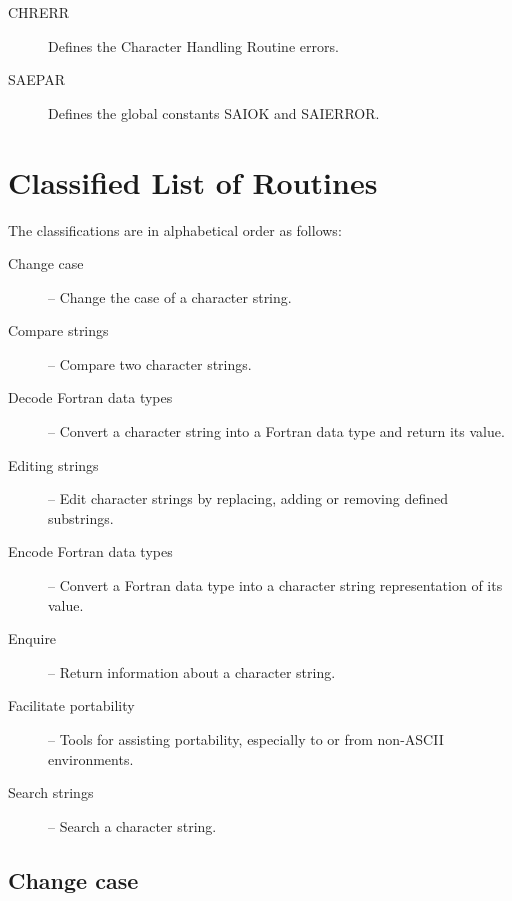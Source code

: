 \documentclass[twoside,11pt]{article}
\renewcommand{\_}{\texttt{\symbol{95}}}
\begin{document}
\begin {description}
\item [CHR\_ERR] Defines the Character Handling Routine errors.
\item [SAE\_PAR] Defines the global constants SAI\_\_OK and SAI\_\_ERROR.
\end {description}

\newpage
\section {Classified List of Routines \label{class_sect}}

The classifications are in alphabetical order as follows:

\begin{description}
\item[Change case] --
    Change the case of a character string.
\item[Compare strings] --
    Compare two character strings.
\item[Decode Fortran data types] --
    Convert a character string into a Fortran data type and return its
    value.
\item[Editing strings] -- 
    Edit character strings by replacing, adding or removing defined 
    substrings.
\item[Encode Fortran data types] --
    Convert a Fortran data type into a character string representation of
    its value.
\item[Enquire] --
    Return information about a character string.
\item[Facilitate portability] --
    Tools for assisting portability, especially to or from non-ASCII
    environments.
\item[Search strings] --
    Search a character string.
\end{description}


\subsection {Change case}
\end{document}
